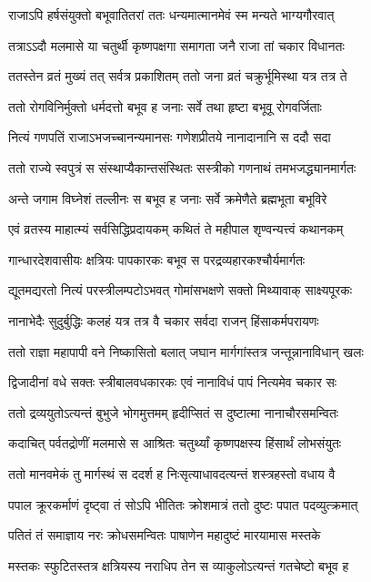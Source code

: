 \twolineshloka
{राजाऽपि हर्षसंयुक्तो बभूवातितरां ततः}
{धन्यमात्मानमेवं स्म मन्यते भाग्यगौरवात्} %

\twolineshloka
{तत्राऽऽदौ मलमासे या चतुर्थी कृष्णपक्षगा}
{समागता जनै राजा तां चकार विधानतः} %

\twolineshloka
{ततस्तेन व्रतं मुख्यं तत् सर्वत्र प्रकाशितम्}
{ततो जना व्रतं चक्रुर्भूमिस्था यत्र तत्र ते} %

\twolineshloka
{ततो रोगविनिर्मुक्तो धर्मदत्तो बभूव ह}
{जनाः सर्वे तथा हृष्टा बभूवू रोगवर्जिताः} %

\twolineshloka
{नित्यं गणपतिं राजाऽभजच्चानन्यमानसः}
{गणेशप्रीतये नानादानानि स ददौ सदा} %

\twolineshloka
{ततो राज्ये स्वपुत्रं स संस्थाप्यैकान्तसंस्थितः}
{सस्त्रीको गणनाथं तमभजद्ध्यानमार्गतः} %

\twolineshloka
{अन्ते जगाम विघ्नेशं तल्लीनः स बभूव ह}
{जनाः सर्वे क्रमेणैते ब्रह्मभूता बभूविरे} %

\twolineshloka
{एवं व्रतस्य माहात्म्यं सर्वसिद्धिप्रदायकम्}
{कथितं ते महीपाल श‍ृण्वन्यत्त्वं कथानकम्} %

\twolineshloka
{गान्धारदेशवासीयः क्षत्रियः पापकारकः}
{बभूव स परद्रव्यहारकश्चौर्यमार्गतः} %

\twolineshloka
{द्यूतमद्यरतो नित्यं परस्त्रीलम्पटोऽभवत्}
{गोमांसभक्षणे सक्तो मिथ्यावाक् साक्ष्यपूरकः} %

\twolineshloka
{नानाभेदैः सुदुर्बुद्धिः कलहं यत्र तत्र वै}
{चकार सर्वदा राजन् हिंसाकर्मपरायणः} %

\twolineshloka
{ततो राज्ञा महापापी वने निष्कासितो बलात्}
{जघान मार्गगांस्तत्र जन्तून्नानाविधान् खलः} %

\twolineshloka
{द्विजादीनां वधे सक्तः स्त्रीबालवधकारकः}
{एवं नानाविधं पापं नित्यमेव चकार सः} %

\twolineshloka
{ततो द्रव्ययुतोऽत्यन्तं बुभुजे भोगमुत्तमम्}
{हृदीप्सितं स दुष्टात्मा नानाचौरसमन्वितः} %

\twolineshloka
{कदाचित् पर्वतद्रोणीं मलमासे स आश्रितः}
{चतुर्थ्यां कृष्णपक्षस्य हिंसार्थं लोभसंयुतः} %

\twolineshloka
{ततो मानवमेकं तु मार्गस्थं स ददर्श ह}
{निःसृत्याधावदत्यन्तं शस्त्रहस्तो वधाय वै} %

\twolineshloka
{पपाल क्रूरकर्माणं दृष्ट्वा तं सोऽपि भीतितः}
{क्रोशमात्रं ततो दुष्टः पपात पदव्युत्क्रमात्} %

\twolineshloka
{पतितं तं समाज्ञाय नरः क्रोधसमन्वितः}
{पाषाणेन महादुष्टं मारयामास मस्तके} %

\twolineshloka
{मस्तकः स्फुटितस्तत्र क्षत्रियस्य नराधिप}
{तेन स व्याकुलोऽत्यन्तं गतचेष्टो बभूव ह} %

